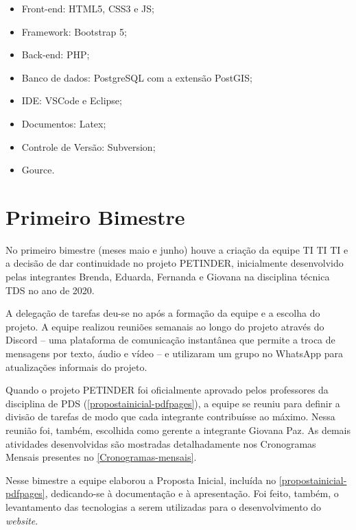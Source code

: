 \begin{itemize}
\item Front-end: \ac{HTML}5, \ac{CSS}3 e \ac{JS};

\item Framework: \gls{Bootstrap} 5;

\item Back-end: \ac{PHP};

\item Banco de dados: \gls{PostgreSQL} com a extensão \gls{PostGIS};

\item IDE: \gls{VSCode} e \gls{Eclipse};

\item Documentos: \gls{Latex};

\item Controle de Versão: \gls{Subversion};

\item \gls{Gource}.
\end{itemize}


\section{Primeiro Bimestre}
No primeiro bimestre (meses maio e junho) houve a criação da equipe TI TI TI e a decisão de dar continuidade no projeto PETINDER, inicialmente desenvolvido pelas integrantes Brenda, Eduarda, Fernanda e Giovana na disciplina técnica \ac{TDS} no ano de 2020.  

A delegação de tarefas deu-se no após a formação da equipe e a escolha do projeto. A equipe realizou reuniões semanais ao longo do projeto através do \gls{Discord} – uma plataforma de comunicação instantânea que permite a troca de mensagens por texto, áudio e vídeo – e utilizaram um grupo no \gls{WhatsApp} para atualizações informais do projeto. 

Quando o projeto PETINDER foi oficialmente aprovado pelos professores da disciplina de \ac{PDS} (\autoref{propostainicial-pdfpages}), a equipe se reuniu para definir a divisão de tarefas de modo que cada integrante contribuísse ao máximo. Nessa reunião foi, também, escolhida como gerente a integrante Giovana Paz. As demais atividades desenvolvidas são mostradas detalhadamente nos Cronogramas Mensais presentes no \autoref{Cronogramas-mensais}.

Nesse bimestre a equipe elaborou a Proposta Inicial, incluída no  \autoref{propostainicial-pdfpages}, dedicando-se à documentação e à apresentação. Foi feito, também, o levantamento das tecnologias a serem utilizadas para o desenvolvimento do \textit{website}.


